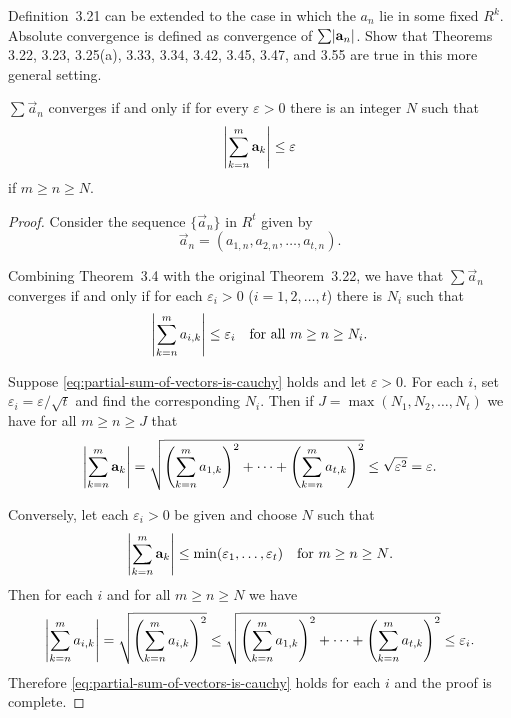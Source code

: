  Definition~3.21 can be extended to the case in which the
$a_n$ lie in some fixed $R^k$. Absolute convergence is defined as
convergence of $\sum\lvert{\mathbf{a}_n}\rvert$. Show that Theorems 3.22, 3.23,
3.25(a), 3.33, 3.34, 3.42, 3.45, 3.47, and 3.55 are true in this more
general setting.
\begin{thm}
  $\sum\vec{a}_n$ converges if and only if for every $\varepsilon > 0$
  there is an integer $N$ such that
  \begin{equation*}
    \left\lvert{\sum_{k=n}^m\mathbf{a}_k}\right\rvert\leq\varepsilon
  \end{equation*}
  if $m\geq n\geq N$.
\end{thm}
\begin{proof}
  Consider the sequence $\{\vec{a}_n\}$ in $R^t$ given by
  \begin{equation*}
    \vec{a}_n = (a_{1,n}, a_{2,n}, \dots, a_{t,n}).
  \end{equation*}

  Combining Theorem~3.4 with the original Theorem~3.22, we have that
  $\sum\vec{a}_n$ converges if and only if for each $\varepsilon_i>0$
  ($i = 1,2,\dots,t$) there is $N_i$ such that
  \begin{equation}
    \label{eq:partial-sum-of-vectors-is-cauchy}
    \left\lvert{\sum_{k=n}^ma_{i,k}}\right\rvert \leq \varepsilon_i
    \quad\text{for all $m\geq n\geq N_i$}.
  \end{equation}

  Suppose \eqref{eq:partial-sum-of-vectors-is-cauchy} holds and let
  $\varepsilon>0$. For each $i$, set
  $\varepsilon_i = \varepsilon/\sqrt{t}$ and find the corresponding
  $N_i$. Then if $J = \max(N_1,N_2,\dots,N_t)$ we have for all
  $m\geq n\geq J$ that
  \begin{equation*}
    \left\lvert{\sum_{k=n}^m\mathbf{a}_k}\right\rvert
    = \sqrt{\left(\sum_{k=n}^ma_{1,k}\right)^2
      + \cdots
      + \left(\sum_{k=n}^ma_{t,k}\right)^2}
    \leq \sqrt{\varepsilon^2} = \varepsilon.
  \end{equation*}

  Conversely, let each $\varepsilon_i>0$ be given and choose $N$ such that
  \begin{equation*}
    \left\lvert{\sum_{k=n}^m\mathbf{a}_k}\right\rvert\leq\min(\varepsilon_1,
    \dots,\varepsilon_t)
    \quad\text{for $m\geq n\geq N$}.
  \end{equation*}
  Then for each $i$ and for all $m\geq n\geq N$ we have
  \begin{equation*}
    \left\lvert{\sum_{k=n}^ma_{i,k}}\right\rvert
    = \sqrt{\left(\sum_{k=n}^ma_{i,k}\right)^2}
    \leq \sqrt{\left(\sum_{k=n}^ma_{1,k}\right)^2
      +\cdots+
      \left(\sum_{k=n}^ma_{t,k}\right)^2} \leq \varepsilon_i.
  \end{equation*}
  Therefore \eqref{eq:partial-sum-of-vectors-is-cauchy} holds for each
  $i$ and the proof is complete.
\end{proof}
